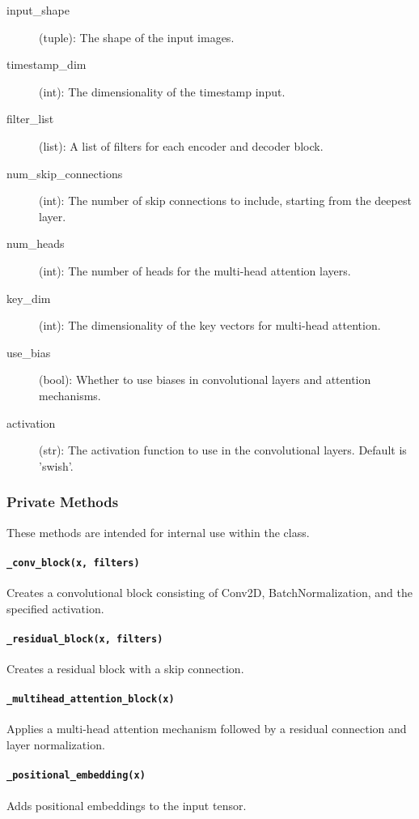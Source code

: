 \documentclass{article}
\begin{document}
\begin{description}
    \item[input\_shape] (tuple): The shape of the input images.
    \item[timestamp\_dim] (int): The dimensionality of the timestamp input.
    \item[filter\_list] (list): A list of filters for each encoder and decoder block.
    \item[num\_skip\_connections] (int): The number of skip connections to include, starting from the deepest layer.
    \item[num\_heads] (int): The number of heads for the multi-head attention layers.
    \item[key\_dim] (int): The dimensionality of the key vectors for multi-head attention.
    \item[use\_bias] (bool): Whether to use biases in convolutional layers and attention mechanisms.
    \item[activation] (str): The activation function to use in the convolutional layers. Default is 'swish'.
\end{description}

\subsubsection*{Private Methods}
These methods are intended for internal use within the class.

\paragraph*{\texttt{\_conv\_block(x, filters)}}
Creates a convolutional block consisting of Conv2D, BatchNormalization, and the specified activation.

\paragraph*{\texttt{\_residual\_block(x, filters)}}
Creates a residual block with a skip connection.

\paragraph*{\texttt{\_multihead\_attention\_block(x)}}
Applies a multi-head attention mechanism followed by a residual connection and layer normalization.

\paragraph*{\texttt{\_positional\_embedding(x)}}
Adds positional embeddings to the input tensor.
\end{document}

